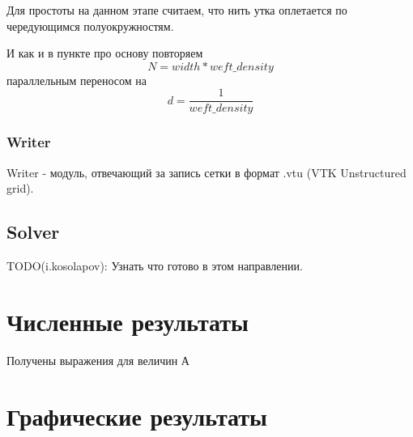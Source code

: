 Для простоты на данном этапе считаем, что нить утка оплетается по чередующимся полуокружностям.

И как и в пункте про основу повторяем
\[
    N = width * weft\_density
\]
параллельным переносом на
\[
    d = \frac{1}{weft\_density}
\]

\subsubsection*{Writer}
Writer - модуль, отвечающий за запись сетки в формат .vtu (VTK Unstructured grid).


\subsection*{Solver}
TODO(i.kosolapov): Узнать что готово в этом направлении.

\section*{Численные результаты}
Получены выражения для величин А

\section*{Графические результаты}
